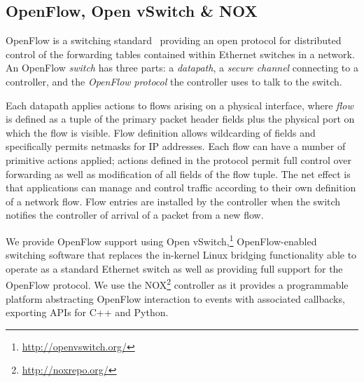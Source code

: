 \subsection{OpenFlow, Open vSwitch \& NOX}
\label{s:openflow}

 
OpenFlow is a switching standard~\cite{mckeown:_openf} providing an
open protocol for distributed control of the forwarding tables contained
within Ethernet switches in a network.  An OpenFlow \emph{switch} has
three parts: a \emph{datapath}, a \emph{secure channel} connecting to
a controller, and the \emph{OpenFlow} \emph{protocol} the controller
uses to talk to the switch.  

Each datapath applies actions to flows
arising on a physical interface, where \emph{flow} is defined as a
tuple of the primary packet header fields plus the physical port on
which the flow is visible.  Flow definition allows wildcarding
of fields and specifically permits netmasks for IP addresses.  Each
flow can have a number of primitive actions applied; actions defined
in the protocol permit full control over forwarding as well as
modification of all fields of the flow tuple.  The net effect is that
applications can manage and control traffic according to their own
definition of a network flow.  Flow entries are installed by the
controller when the switch notifies the controller of arrival of  a
packet from a new flow.

We provide OpenFlow support using Open
vSwitch,\footnote{\url{http://openvswitch.org/}} OpenFlow-enabled
switching software that replaces the in-kernel Linux bridging
functionality able to operate as a standard Ethernet switch as well as
providing full support for the OpenFlow protocol.  We use
the NOX\footnote{\url{http://noxrepo.org/}} controller as
it provides a programmable platform abstracting OpenFlow interaction
to events with associated callbacks, exporting APIs for C++ and
Python.



